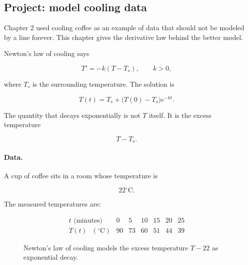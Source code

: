 \subsection{Project: model cooling data}
\label{subsec:project-model-cooling-data}

Chapter 2 used cooling coffee as an example of data that should not be modeled by a
line forever.  This chapter gives the derivative law behind the better model.

Newton's law of cooling says

\[
T'=-k(T-T_s),
\qquad k>0,
\]

where \(T_s\) is the surrounding temperature.  The solution is

\[
T(t)=T_s+\bigl(T(0)-T_s\bigr)e^{-kt}.
\]

The quantity that decays exponentially is not \(T\) itself.  It is the excess temperature

\[
T-T_s.
\]

\paragraph{Data.}
A cup of coffee sits in a room whose temperature is

\[
22^\circ\text{C}.
\]

The measured temperatures are:

\[
\begin{array}{c|cccccc}
t\text{ (minutes)} & 0 & 5 & 10 & 15 & 20 & 25 \\ \hline
T(t)\text{ }(^\circ\text{C}) & 90 & 73 & 60 & 51 & 44 & 39
\end{array}
\]

\begin{figure}[h]
\centering
{}
\caption{Newton's law of cooling models the excess temperature \(T-22\) as exponential decay.}
\label{fig:cooling-data-project}
\end{figure}

